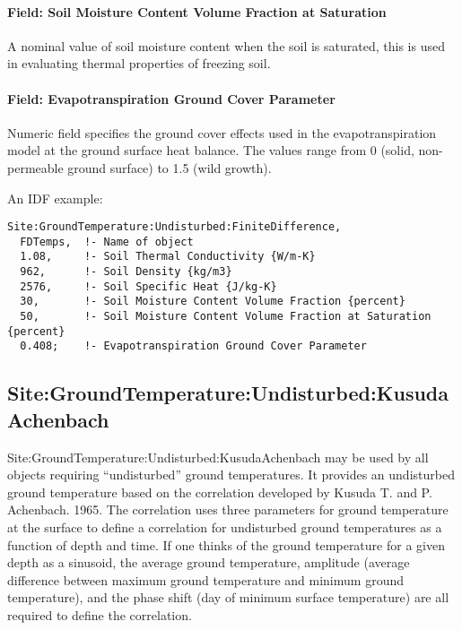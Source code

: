\paragraph{Field: Soil Moisture Content Volume Fraction at Saturation}\label{field-soil-moisture-content-volume-fraction-at-saturation}

A nominal value of soil moisture content when the soil is saturated, this is used in evaluating thermal properties of freezing soil.

\paragraph{Field: Evapotranspiration Ground Cover Parameter}\label{field-evapotranspiration-ground-cover-parameter}

Numeric field specifies the ground cover effects used in the evapotranspiration model at the ground surface heat balance. The values range from 0 (solid, non-permeable ground surface) to 1.5 (wild growth).

An IDF example:

\begin{lstlisting}
Site:GroundTemperature:Undisturbed:FiniteDifference,
  FDTemps,  !- Name of object
  1.08,     !- Soil Thermal Conductivity {W/m-K}
  962,      !- Soil Density {kg/m3}
  2576,     !- Soil Specific Heat {J/kg-K}
  30,       !- Soil Moisture Content Volume Fraction {percent}
  50,       !- Soil Moisture Content Volume Fraction at Saturation {percent}
  0.408;    !- Evapotranspiration Ground Cover Parameter
\end{lstlisting}

\subsection{Site:GroundTemperature:Undisturbed:KusudaAchenbach}\label{sitegroundtemperatureundisturbedkusudaachenbach}

Site:GroundTemperature:Undisturbed:KusudaAchenbach may be used by all objects requiring ``undisturbed'' ground temperatures. It provides an undisturbed ground temperature based on the correlation developed by Kusuda T. and P. Achenbach. 1965. The correlation uses three parameters for ground temperature at the surface to define a correlation for undisturbed ground temperatures as a function of depth and time. If one thinks of the ground temperature for a given depth as a sinusoid, the average ground temperature, amplitude (average difference between maximum ground temperature and minimum ground temperature), and the phase shift (day of minimum surface temperature) are all required to define the correlation.

